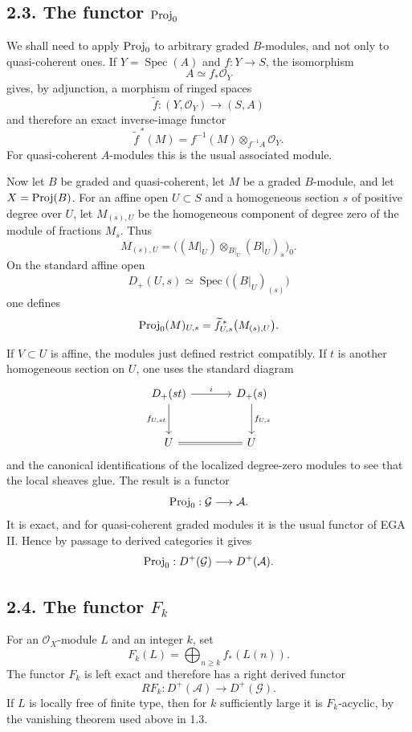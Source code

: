 \documentclass[11pt]{article}
\newcommand{\Spec}{\operatorname{Spec}}
\begin{document}
\subsection*{2.3. The functor \(\operatorname{Proj}_0\)}
We shall need to apply \(\operatorname{Proj}_0\) to arbitrary graded \(B\)-modules, and not only to quasi-coherent ones. If \(Y=\Spec(A)\) and \(f:Y\to S\), the isomorphism
\[
  A\simeq f_*\mathcal O_Y
\]
gives, by adjunction, a morphism of ringed spaces
\[
  \widetilde f:(Y,\mathcal O_Y)\longrightarrow (S,A)
\]
and therefore an exact inverse-image functor
\[
  \widetilde f^{\,*}(M)=f^{-1}(M)\otimes_{f^{-1}A}\mathcal O_Y.
\]
For quasi-coherent \(A\)-modules this is the usual associated module.

Now let \(B\) be graded and quasi-coherent, let \(M\) be a graded \(B\)-module, and let \(X=\operatorname{Proj}(B)\). For an affine open \(U\subset S\) and a homogeneous section \(s\) of positive degree over \(U\), let \(M_{(s),U}\) be the homogeneous component of degree zero of the module of fractions \(M_s\). Thus
\[
  M_{(s),U}=
  \bigl((M|_U)\otimes_{B|_U}(B|_U)_s\bigr)_0 .
\]
On the standard affine open
\[
  D_+(U,s)\simeq \Spec\bigl((B|_U)_{(s)}\bigr)
\]
one defines
\[
  \operatorname{Proj}_0(M)_{U,s}
  =
  \widetilde f_{U,s}^{\,*}\bigl(M_{(s),U}\bigr).
\]

If \(V\subset U\) is affine, the modules just defined restrict compatibly. If \(t\) is another homogeneous section on \(U\), one uses the standard diagram
\[
\begin{tikzcd}[column sep=large,row sep=large]
D_+(st) \arrow[r,"i"] \arrow[d,"f_{U,st}"'] &
D_+(s) \arrow[d,"f_{U,s}"]\\
U \arrow[r,equal] & U
\end{tikzcd}
\]
and the canonical identifications of the localized degree-zero modules to see that the local sheaves glue. The result is a functor
\[
  \operatorname{Proj}_0:\mathcal G\longrightarrow\mathcal A .
\]
It is exact, and for quasi-coherent graded modules it is the usual functor of EGA II. Hence by passage to derived categories it gives
\[
  \operatorname{Proj}_0:D^+(\mathcal G)\longrightarrow D^+(\mathcal A).
\]

\subsection*{2.4. The functor \(F_k\)}
For an \(\mathcal O_X\)-module \(L\) and an integer \(k\), set
\begin{equation}\tag{2.4.1}
  F_k(L)=\bigoplus_{n\geq k} f_*(L(n)).
\end{equation}
The functor \(F_k\) is left exact and therefore has a right derived functor
\begin{equation}\tag{2.4.2}
  RF_k:D^+(\mathcal A)\longrightarrow D^+(\mathcal G).
\end{equation}
If \(L\) is locally free of finite type, then for \(k\) sufficiently large it is \(F_k\)-acyclic, by the vanishing theorem used above in 1.3.
\end{document}
